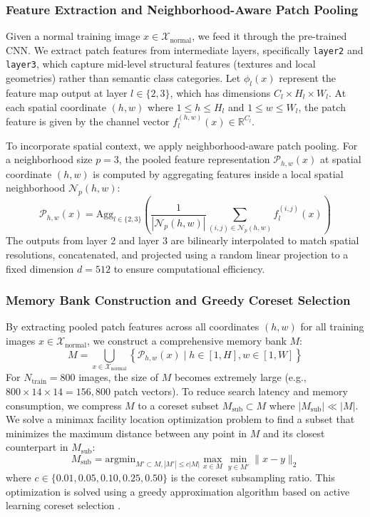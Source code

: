 \documentclass[runningheads]{llncs}
\begin{document}
\subsubsection{Feature Extraction and Neighborhood-Aware Patch Pooling}
Given a normal training image $x \in \mathcal{X}_{\text{normal}}$, we feed it through the pre-trained CNN. We extract patch features from intermediate layers, specifically \texttt{layer2} and \texttt{layer3}, which capture mid-level structural features (textures and local geometries) rather than semantic class categories. Let $\phi_l(x)$ represent the feature map output at layer $l \in \{2, 3\}$, which has dimensions $C_l \times H_l \times W_l$. At each spatial coordinate $(h, w)$ where $1 \le h \le H_l$ and $1 \le w \le W_l$, the patch feature is given by the channel vector $f^{(h,w)}_l(x) \in \mathbb{R}^{C_l}$.

To incorporate spatial context, we apply neighborhood-aware patch pooling. For a neighborhood size $p=3$, the pooled feature representation $\mathcal{P}_{h,w}(x)$ at spatial coordinate $(h,w)$ is computed by aggregating features inside a local spatial neighborhood $\mathcal{N}_p(h,w)$:
\begin{equation}
\mathcal{P}_{h,w}(x) = \text{Agg}_{l \in \{2, 3\}} \left( \frac{1}{|\mathcal{N}_p(h,w)|} \sum_{(i,j) \in \mathcal{N}_p(h,w)} f^{(i,j)}_l(x) \right)
\end{equation}
The outputs from layer 2 and layer 3 are bilinearly interpolated to match spatial resolutions, concatenated, and projected using a random linear projection to a fixed dimension $d=512$ to ensure computational efficiency.

\subsubsection{Memory Bank Construction and Greedy Coreset Selection}
By extracting pooled patch features across all coordinates $(h,w)$ for all training images $x \in \mathcal{X}_{\text{normal}}$, we construct a comprehensive memory bank $M$:
\begin{equation}
M = \bigcup_{x \in \mathcal{X}_{\text{normal}}} \left\{ \mathcal{P}_{h,w}(x) \mid h \in [1, H], w \in [1, W] \right\}
\end{equation}
For $N_{\text{train}} = 800$ images, the size of $M$ becomes extremely large (e.g., $800 \times 14 \times 14 = 156,800$ patch vectors). To reduce search latency and memory consumption, we compress $M$ to a coreset subset $M_{\text{sub}} \subset M$ where $|M_{\text{sub}}| \ll |M|$. We solve a minimax facility location optimization problem to find a subset that minimizes the maximum distance between any point in $M$ and its closest counterpart in $M_{\text{sub}}$:
\begin{equation}
M_{\text{sub}} = \text{argmin}_{M' \subset M, |M'| \le c|M|} \max_{x \in M} \min_{y \in M'} \|x - y\|_2
\end{equation}
where $c \in \{0.01, 0.05, 0.10, 0.25, 0.50\}$ is the coreset subsampling ratio. This optimization is solved using a greedy approximation algorithm based on active learning coreset selection \cite{sener2018active}.
\end{document}
